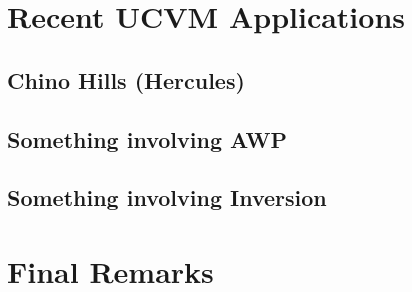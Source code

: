 












\section{Recent UCVM Applications}
\subsection{Chino Hills (Hercules)}
\subsection{Something involving AWP}
\subsection{Something involving Inversion}

\section{Final Remarks}

